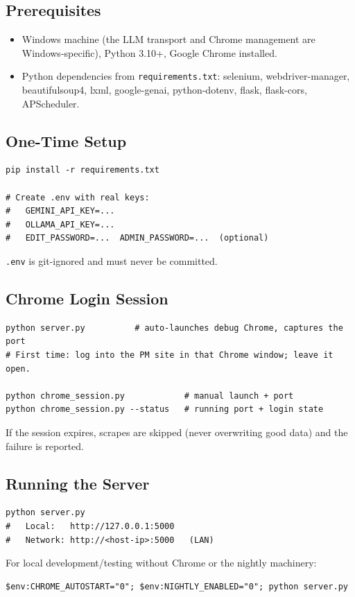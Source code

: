 \documentclass[11pt,a4paper]{article}
\newcommand{\code}[1]{\texttt{#1}}
\begin{document}
\subsection{Prerequisites}
\begin{itemize}
    \item Windows machine (the LLM transport and Chrome management are
          Windows-specific), Python 3.10+, Google Chrome installed.
    \item Python dependencies from \code{requirements.txt}: selenium,
          webdriver-manager, beautifulsoup4, lxml, google-genai,
          python-dotenv, flask, flask-cors, APScheduler.
\end{itemize}

\subsection{One-Time Setup}
\begin{lstlisting}
pip install -r requirements.txt

# Create .env with real keys:
#   GEMINI_API_KEY=...
#   OLLAMA_API_KEY=...
#   EDIT_PASSWORD=...  ADMIN_PASSWORD=...  (optional)
\end{lstlisting}
\code{.env} is git-ignored and must never be committed.

\subsection{Chrome Login Session}
\begin{lstlisting}
python server.py          # auto-launches debug Chrome, captures the port
# First time: log into the PM site in that Chrome window; leave it open.

python chrome_session.py            # manual launch + port
python chrome_session.py --status   # running port + login state
\end{lstlisting}
If the session expires, scrapes are skipped (never overwriting good data)
and the failure is reported.

\subsection{Running the Server}
\begin{lstlisting}
python server.py
#   Local:   http://127.0.0.1:5000
#   Network: http://<host-ip>:5000   (LAN)
\end{lstlisting}
For local development/testing without Chrome or the nightly machinery:
\begin{lstlisting}
$env:CHROME_AUTOSTART="0"; $env:NIGHTLY_ENABLED="0"; python server.py
\end{lstlisting}
\end{document}
